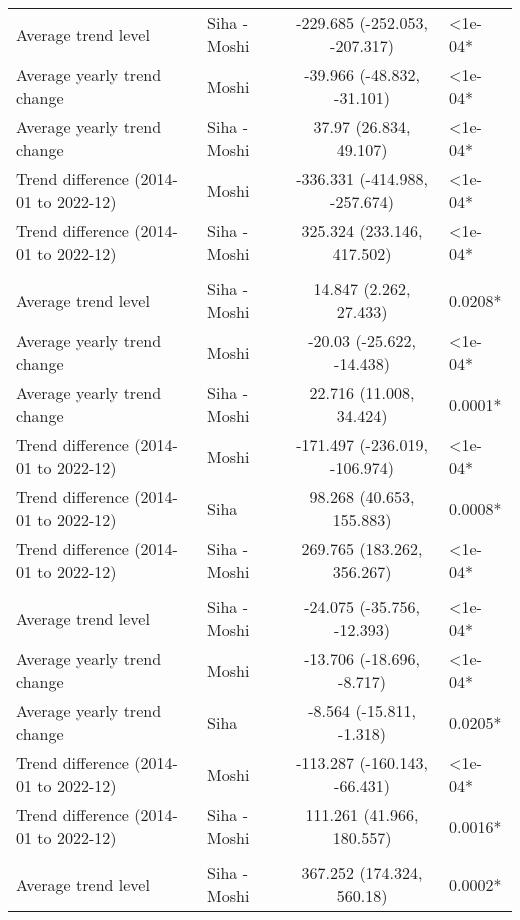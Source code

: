 \begin{longtable}{l|lcl}
\midrule\addlinespace[2.5pt]
\multicolumn{4}{l}{Neurological} \\ 
\midrule\addlinespace[2.5pt]
Average trend level & Siha - Moshi & -229.685 (-252.053, -207.317) & <1e-04* \\ 
Average yearly trend change & Moshi & -39.966 (-48.832, -31.101) & <1e-04* \\ 
Average yearly trend change & Siha - Moshi & 37.97 (26.834, 49.107) & <1e-04* \\ 
Trend difference (2014-01 to 2022-12) & Moshi & -336.331 (-414.988, -257.674) & <1e-04* \\ 
Trend difference (2014-01 to 2022-12) & Siha - Moshi & 325.324 (233.146, 417.502) & <1e-04* \\ 
\midrule\addlinespace[2.5pt]
\multicolumn{4}{l}{Other Communicable Diseases} \\ 
\midrule\addlinespace[2.5pt]
Average trend level & Siha - Moshi & 14.847 (2.262, 27.433) & 0.0208* \\ 
Average yearly trend change & Moshi & -20.03 (-25.622, -14.438) & <1e-04* \\ 
Average yearly trend change & Siha - Moshi & 22.716 (11.008, 34.424) & 0.0001* \\ 
Trend difference (2014-01 to 2022-12) & Moshi & -171.497 (-236.019, -106.974) & <1e-04* \\ 
Trend difference (2014-01 to 2022-12) & Siha & 98.268 (40.653, 155.883) & 0.0008* \\ 
Trend difference (2014-01 to 2022-12) & Siha - Moshi & 269.765 (183.262, 356.267) & <1e-04* \\ 
\midrule\addlinespace[2.5pt]
\multicolumn{4}{l}{Respiratory Diseases} \\ 
\midrule\addlinespace[2.5pt]
Average trend level & Siha - Moshi & -24.075 (-35.756, -12.393) & <1e-04* \\ 
Average yearly trend change & Moshi & -13.706 (-18.696, -8.717) & <1e-04* \\ 
Average yearly trend change & Siha & -8.564 (-15.811, -1.318) & 0.0205* \\ 
Trend difference (2014-01 to 2022-12) & Moshi & -113.287 (-160.143, -66.431) & <1e-04* \\ 
Trend difference (2014-01 to 2022-12) & Siha - Moshi & 111.261 (41.966, 180.557) & 0.0016* \\ 
\midrule\addlinespace[2.5pt]
\multicolumn{4}{l}{Respiratory Infections} \\ 
\midrule\addlinespace[2.5pt]
Average trend level & Siha - Moshi & 367.252 (174.324, 560.18) & 0.0002* \\ 

\end{longtable}
